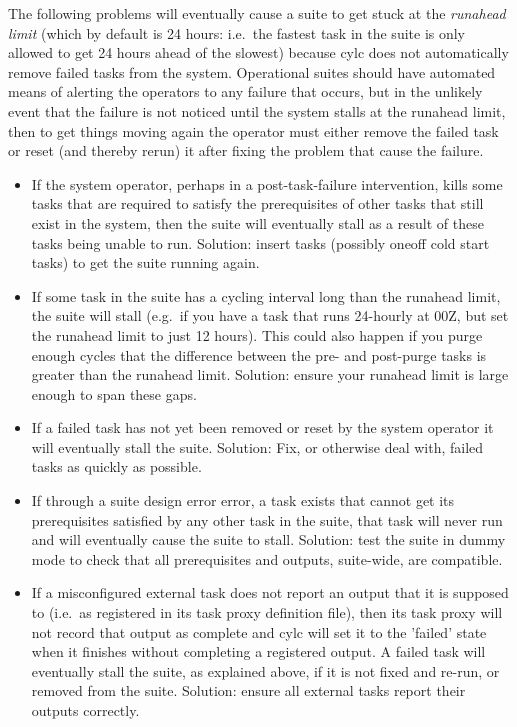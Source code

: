 \documentclass[11pt,a4paper]{article}
\begin{document}
The following problems will eventually cause a suite to get stuck at
the {\em runahead limit} (which by default is 24 hours: i.e.\ the
fastest task in the suite is only allowed to get 24 hours ahead of the
slowest) because cylc does not automatically remove failed tasks from
the system.  Operational suites should have automated means of
alerting the operators to any failure that occurs, but in the
unlikely event that the failure is not noticed until the system stalls
at the runahead limit, then to get things moving again the operator must
either remove the failed task or reset (and thereby rerun) it after
fixing the problem that cause the failure.

\begin{itemize}
    \item If the system operator, perhaps in a post-task-failure
    intervention, kills some tasks that are required to satisfy the
    prerequisites of other tasks that still exist in the system, then 
    the suite will eventually stall as a result of these tasks being
    unable to run. Solution: insert tasks (possibly oneoff cold start
    tasks) to get the suite running again.

    \item If some task in the suite has a cycling interval long than
        the runahead limit, the suite will stall (e.g.\ if
    you have a task that runs 24-hourly at 00Z, but set the runahead
    limit to just 12 hours). This could also happen if you purge enough
    cycles that the difference between the pre- and post-purge tasks
    is greater than the runahead limit. Solution: ensure your runahead
    limit is large enough to span these gaps.

    \item If a failed task has not yet been removed or reset by the
    system operator it will eventually stall the suite. Solution:
    Fix, or otherwise deal with, failed tasks as quickly as possible.

    \item If through a suite design error error, a task exists that
        cannot get its prerequisites satisfied by any other task in the
        suite, that task will never run and will eventually cause the
        suite to stall.  Solution: test the suite in dummy mode to 
        check that all prerequisites and outputs, suite-wide, are 
        compatible.

    \item If a misconfigured external task does not report an output
        that it is supposed to (i.e.\ as registered in its task proxy
        definition file), then its task proxy will not record that 
        output as complete and cylc will set it to the 'failed' state
        when it finishes without completing a registered output. A
        failed task will eventually stall the suite, as explained above, 
        if it is not fixed and re-run, or removed from the suite.
        Solution: ensure all external tasks report their outputs
        correctly.

\end{itemize}
\end{document}
